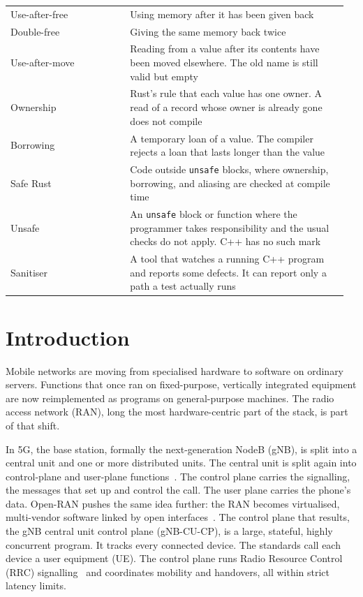 \documentclass[english,oneside,a4paper,censored,csm,software-track-2020]{HYthesisML}
\begin{document}
\begin{longtable}{@{}>{\footnotesize\raggedright\arraybackslash}p{0.34\linewidth} >{\footnotesize\raggedright\arraybackslash}p{0.62\linewidth}@{}}
Use-after-free & Using memory after it has been given back \\
Double-free & Giving the same memory back twice \\
Use-after-move & Reading from a value after its contents have been moved elsewhere. The old name is still valid but empty \\
Ownership & Rust's rule that each value has one owner. A read of a record whose owner is already gone does not compile \\
Borrowing & A temporary loan of a value. The compiler rejects a loan that lasts longer than the value \\
Safe Rust & Code outside \texttt{unsafe} blocks, where ownership, borrowing, and aliasing are checked at compile time \\
Unsafe & An \texttt{unsafe} block or function where the programmer takes responsibility and the usual checks do not apply. C++ has no such mark \\
Sanitiser & A tool that watches a running C++ program and reports some defects. It can report only a path a test actually runs \\
\hline
\end{longtable}
\endgroup


\cleardoublepage
\mainmatter


\chapter{Introduction}

Mobile networks are moving from specialised hardware to software on ordinary servers.
Functions that once ran on fixed-purpose, vertically integrated equipment are now
reimplemented as programs on general-purpose machines. The radio access network (RAN),
long the most hardware-centric part of the stack, is part of that shift.

In 5G, the base station, formally the next-generation NodeB (gNB), is split into a central
unit and one or more distributed units. The central unit is split again into control-plane
and user-plane functions~\cite{3gpp38401,3gpp38300}. The control plane carries the signalling, the messages that set up and control
the call. The user plane carries the phone’s data. Open-RAN pushes the same idea further:
the RAN becomes virtualised, multi-vendor software linked by open
interfaces~\cite{polese2023oran}. The control plane that results, the gNB central unit
control plane (gNB-CU-CP), is a large, stateful, highly concurrent program. It tracks every
connected device. The standards call each device a user equipment (UE). The control plane runs
Radio Resource Control (RRC) signalling~\cite{3gpp38331} and coordinates mobility and
handovers, all within strict latency limits.
\end{document}
